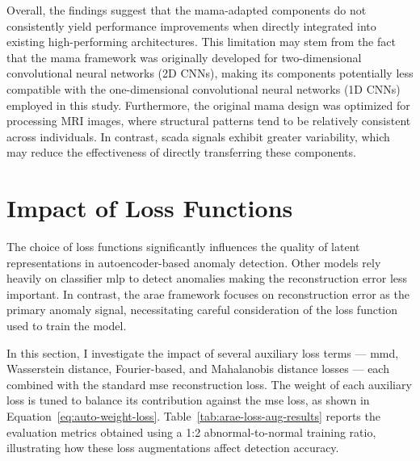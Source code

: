 Overall, the findings suggest that the \gls{mama}-adapted components do not consistently yield performance improvements when directly integrated into existing high-performing architectures. 
This limitation may stem from the fact that the \gls{mama} framework was originally developed for two-dimensional convolutional neural networks (2D CNNs), making its components potentially less compatible with the one-dimensional convolutional neural networks (1D CNNs) employed in this study. 
Furthermore, the original \gls{mama} design was optimized for processing MRI images, where structural patterns tend to be relatively consistent across individuals. 
In contrast, \gls{scada} signals exhibit greater variability, which may reduce the effectiveness of directly transferring these components.



\section{Impact of Loss Functions}
\label{sec:loss-functions}
The choice of loss functions significantly influences the quality of latent representations in autoencoder-based anomaly detection.
Other models rely heavily on classifier \gls{mlp} to detect anomalies making the reconstruction error less important.
In contrast, the \gls{arae} framework focuses on reconstruction error as the primary anomaly signal, necessitating careful consideration of the loss function used to train the model.

In this section, I investigate the impact of several auxiliary loss terms — \gls{mmd}, Wasserstein distance, Fourier-based, and Mahalanobis distance losses — each combined with the standard \gls{mse} reconstruction loss.
The weight of each auxiliary loss is tuned to balance its contribution against the \gls{mse} loss, as shown in Equation~\ref{eq:auto-weight-loss}.
Table~\ref{tab:arae-loss-aug-results} reports the evaluation metrics obtained using a 1:2 abnormal-to-normal training ratio, illustrating how these loss augmentations affect detection accuracy.

